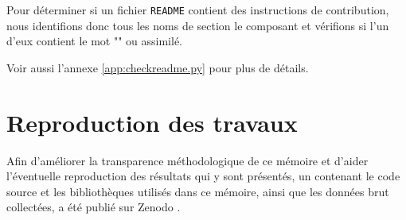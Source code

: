 Pour déterminer si un fichier \texttt{README} contient des instructions de contribution, nous identifions donc
tous les noms de section le composant et vérifions si l'un d'eux contient le mot "" ou
assimilé.

Voir aussi l'annexe \ref{app:checkreadme.py} pour plus de détails.

\section{Reproduction des travaux}

Afin d'améliorer la transparence méthodologique de ce mémoire et d'aider l'éventuelle reproduction des
résultats qui y sont présentés, un  contenant le code source et les bibliothèques
utilisés dans ce mémoire, ainsi que les données brut collectées, a été publié sur Zenodo
\parencite{replication-package}.

